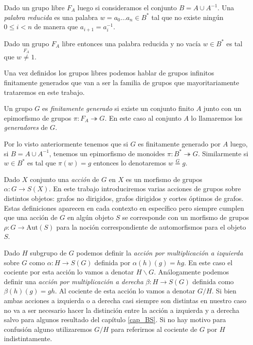 \documentclass[tesis.tex]{subfiles}
\begin{document}
\begin{deff}
	Dado un grupo libre $F_{A}$ luego si consideramos el conjunto $B = A \cup A^{-1}$. 
	Una \emph{palabra reducida} es una palabra $w = a_{0} \dots a_{n} \in B^{*}$ tal que no existe ningún $0 \le i < n$ de manera que $a_{i+1}=a_{i}^{-1}$.
\end{deff}


\begin{obs}\label{obs_libres_pal_red}
	Dado un grupo $F_{A}$ libre entonces una palabra reducida y no vacía $w \in B^*$  es tal que $w \overset{F_{A}}{\neq} 1$.
\end{obs}

Una vez definidos los grupos libres podemos hablar de grupos infinitos finitamente generados que van a ser la familia de grupos que mayoritariamente trataremos en este trabajo.


\begin{deff}
	Un grupo $G$ es \emph{finitamente generado} si existe un conjunto finito $A$ junto con un epimorfismo de grupos $\pi: F_{A} \twoheadrightarrow G$.
	En este caso al conjunto $A$ lo llamaremos los \emph{generadores} de $G$.
\end{deff}

Por lo visto anteriormente tenemos que si $G$ es finitamente generado por $A$ luego, si $B = A \cup A^{-1}$, 
tenemos un epimorfismo de monoides $\pi:B^* \twoheadrightarrow G$.
Similarmente si $w \in B^*$ es tal que $\pi(w) = g$ entonces lo denotaremos $w \overset{G}{=} g$.

\medskip



Dado $X$ conjunto una \emph{acción} de $G$ en $X$ es un morfismo de grupos $\alpha: G \to S(X)$.
En este trabajo introduciremos varias acciones de grupos sobre distintos objetos: grafos no dirigidos, grafos dirigidos y cortes óptimos de grafos. 
Estas definiciones aparecen en cada contexto en específico pero siempre cumplen que una acción de $G$ en algún objeto $S$ se corresponde con un morfismo de grupos $\rho:G \to \text{Aut}(S)$ para la noción correspondiente de automorfismos para el objeto $S$.

	
Dado $H$ subgrupo de $G$ podemos definir la \emph{acción por multiplicación a izquierda} sobre $G$ como $\alpha: H \to S(G)$ definida por $\alpha(h)(g) = hg$.
En este caso el cociente por esta acción lo vamos a denotar $H \backslash G $.
Análogamente podemos definir una \emph{acción por multiplicación a derecha} $\beta:H \to S(G)$ definida como $\beta(h)(g) = gh$.
Al cociente de esta acción lo vamos a denotar $G/H$.
Si bien ambas acciones a izquierda o a derecha casi siempre son distintas en nuestro caso no va a ser necesario hacer la distinción entre la acción a izquierda y a derecha salvo para algunos resultado del capítulo \ref{cap_BS}.
Si no hay motivo para confusión alguno utilizaremos $G/H$ para referirnos al cociente de $G$ por $H$ indistintamente.
\end{document}
